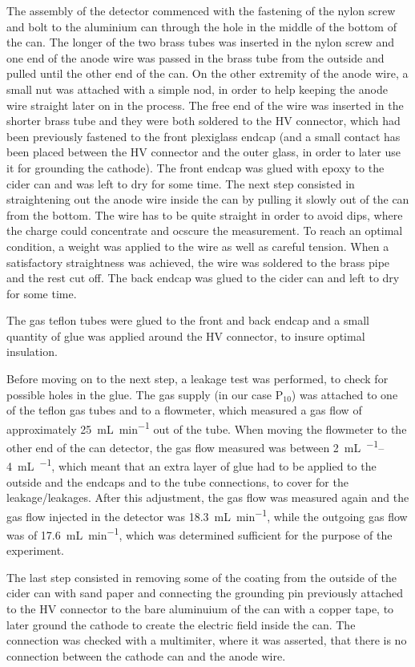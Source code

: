 The assembly of the detector commenced with the fastening of the nylon screw and
bolt to the aluminium can through the hole in the middle of the bottom of the
can. The longer of the two brass tubes was inserted in the nylon screw and one
end of the anode wire was passed in the brass tube from the outside and pulled
until the other end of the can. On the other extremity of the anode wire, a
small nut was attached with a simple nod, in order to help keeping the anode
wire straight later on in the process. The free end of the wire was inserted in
the shorter brass tube and they were both soldered to the HV connector, which
had been previously fastened to the front plexiglass endcap (and a small contact
has been placed between the HV connector and the outer glass, in order to later
use it for grounding the cathode). The front endcap was glued with epoxy to the
cider can and was left to dry for some time. The next step consisted in
straightening out the anode wire inside the can by pulling it slowly out of the
can from the bottom. The wire has to be quite straight in order to avoid dips,
where the charge could concentrate and ocscure the measurement. To reach an
optimal condition, a weight was applied to the wire as well as careful tension.
When a satisfactory straightness was achieved, the wire was soldered to the
brass pipe and the rest cut off. The back endcap was glued to the cider can and
left to dry for some time.

The gas teflon tubes were glued to the front and back endcap and a small
quantity of glue was applied around the HV connector, to insure optimal
insulation.

Before moving on to the next step, a leakage test was performed, to check for
possible holes in the glue. The gas supply (in our case $\mathrm{P}_{10}$) was
attached to one of the teflon gas tubes and to a flowmeter, which measured a gas
flow of approximately \SI{25}{\milli\liter\per\minute} out of the tube. When
moving the flowmeter to the other end of the can detector, the gas flow measured
was between \SIrange{2}{4}{\milli\liter\per\min}, which meant that an extra layer
of glue had to be applied to the outside and the endcaps and to the tube
connections, to cover for the leakage/leakages. After this adjustment, the gas
flow was measured again and the gas flow injected in the detector was
\SI{18.3}{\milli\liter\per\minute}, while the outgoing gas flow was of
\SI{17.6}{\milli\liter\per\minute}, which was determined sufficient for the
purpose of the experiment.

The last step consisted in removing some of the coating from the outside of the
cider can with sand paper and connecting the grounding pin previously attached
to the HV connector to the bare aluminuium of the can with a copper tape, to
later ground the cathode to create the electric field inside the can. The
connection was checked with a multimiter, where it was asserted, that there is
no connection between the cathode can and the anode wire.


